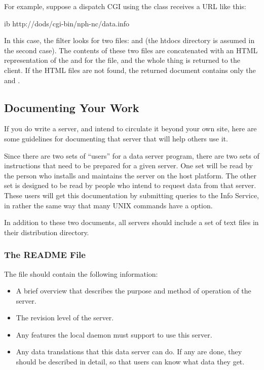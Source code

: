 For example, suppose a dispatch CGI using the 
class receives a URL like this:

\begin{vcode}{ib}
http://dods/cgi-bin/nph-nc/data.info
\end{vcode}

\noindent
In this case, the  filter looks for two files:
 and  (the htdocs directory is
assumed in the second case).  The contents of these two files are
concatenated with an HTML representation of the  and
 for the  file, and the whole thing is
returned to the client.  If the HTML files are not found, the returned
document contains only the  and .


\subsection{Documenting Your Work}
\label{sec,documentation}

If you do write a server, and intend to circulate it beyond your own
site, here are some guidelines for documenting that server that will
help others use it.  

Since there are two sets of ``users'' for a data server program, there
are two sets of instructions that need to be prepared for a given
server. One set will be read by the person who installs and maintains
the server on the host platform. The other set is designed to be read
by people who intend to request data from that server. These users
will get this documentation by submitting queries to the Info
Service, in rather the same way that many UNIX commands have a
 option.

In addition to these two documents, all servers should include a set
of text files in their distribution directory.


\subsubsection{The README File}

The  file should contain the following information:


\begin{itemize}

\item A brief overview that describes the purpose and method of
  operation of the server.

\item The revision level of the server.
  
\item Any features the local  daemon must support to use
  this server.

\item Any data translations that this data server can do.  If any are
  done, they should be described in detail, so that users can know
  what data they get.

\end{itemize}


